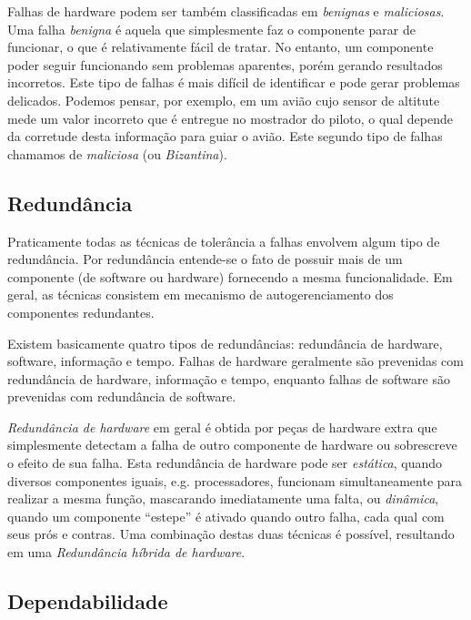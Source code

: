 Falhas de hardware podem ser também classificadas em \emph{benignas} e \emph{maliciosas}. Uma falha \emph{benigna} é aquela que simplesmente faz o componente parar de funcionar, o que é relativamente fácil de tratar. No entanto, um componente poder seguir funcionando sem problemas aparentes, porém gerando resultados incorretos. Este tipo de falhas é mais difícil de identificar e pode gerar problemas delicados. Podemos pensar, por exemplo, em um avião cujo sensor de altitute mede um valor incorreto que é entregue no mostrador do piloto, o qual depende da corretude desta informação para guiar o avião. Este segundo tipo de falhas chamamos de \emph{maliciosa} (ou \emph{Bizantina}).

\subsection{Redundância} %
\label{sub:redundancia}

Praticamente todas as técnicas de tolerância a falhas envolvem algum tipo de redundância. Por redundância entende-se o fato de possuir mais de um componente (de software ou hardware) fornecendo a mesma funcionalidade. Em geral, as técnicas consistem em mecanismo de autogerenciamento dos componentes redundantes.

Existem basicamente quatro tipos de redundâncias: redundância de hardware, software, informação e tempo. %
Falhas de hardware geralmente são prevenidas com redundância de hardware, informação e tempo, enquanto falhas de software são prevenidas com redundância de software.

\emph{Redundância de hardware} em geral é obtida por peças de hardware extra que simplesmente detectam a falha de outro componente de hardware ou sobrescreve o efeito de sua falha. Esta redundância de hardware pode ser \emph{estática}, quando diversos componentes iguais, e.g. processadores, funcionam simultaneamente para realizar a mesma função, mascarando imediatamente uma falta, ou \emph{dinâmica}, quando um componente ``estepe'' é ativado quando outro falha, cada qual com seus prós e contras. Uma combinação destas duas técnicas é possível, resultando em uma \emph{Redundância híbrida de hardware}.

\subsection{Dependabilidade} %
\label{sub:dependabilidade}

